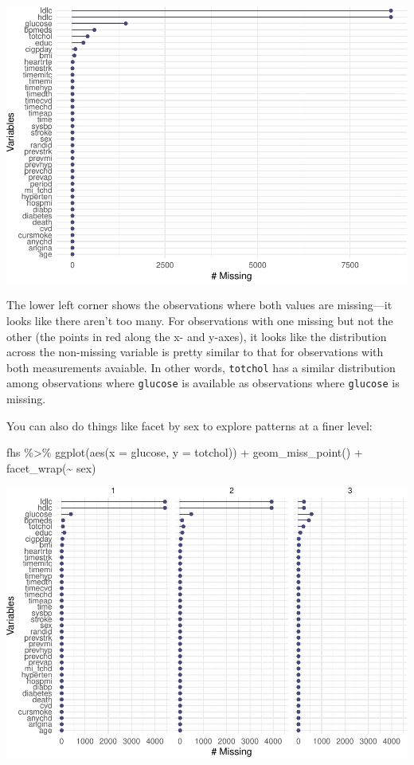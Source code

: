 \documentclass[
]{book}
\newenvironment{Shaded}{\begin{snugshade}}{\end{snugshade}}
\newcommand{\AttributeTok}[1]{\textcolor[rgb]{0.77,0.63,0.00}{#1}}
\newcommand{\FunctionTok}[1]{\textcolor[rgb]{0.00,0.00,0.00}{#1}}
\newcommand{\NormalTok}[1]{#1}
\newcommand{\SpecialCharTok}[1]{\textcolor[rgb]{0.00,0.00,0.00}{#1}}
\begin{document}
\includegraphics{adv_epi_analysis_files/figure-latex/unnamed-chunk-174-1.pdf}

The lower left corner shows the observations where both values are missing---it
looks like there aren't too many. For observations with one missing but not the
other (the points in red along the x- and y-axes), it looks like the distribution
across the non-missing variable is pretty similar to that for observations
with both measurements avaiable. In other words, \texttt{totchol} has a similar
distribution among observations where \texttt{glucose} is available as observations
where \texttt{glucose} is missing.

You can also do things like facet by sex to explore patterns at a finer level:

\begin{Shaded}
\begin{Highlighting}[]
\NormalTok{fhs }\SpecialCharTok{\%\textgreater{}\%} 
  \FunctionTok{ggplot}\NormalTok{(}\FunctionTok{aes}\NormalTok{(}\AttributeTok{x =}\NormalTok{ glucose, }\AttributeTok{y =}\NormalTok{ totchol)) }\SpecialCharTok{+} 
  \FunctionTok{geom\_miss\_point}\NormalTok{() }\SpecialCharTok{+} 
  \FunctionTok{facet\_wrap}\NormalTok{(}\SpecialCharTok{\textasciitilde{}}\NormalTok{ sex)}
\end{Highlighting}
\end{Shaded}

\includegraphics{adv_epi_analysis_files/figure-latex/unnamed-chunk-175-1.pdf}
\end{document}
